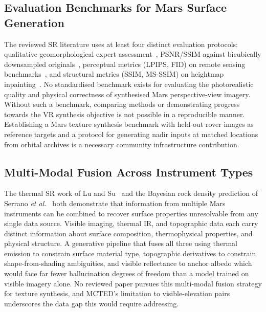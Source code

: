 \documentclass[10pt,journal]{IEEEtran}
\begin{document}
\subsection{Evaluation Benchmarks for Mars Surface Generation}
\label{subsec:eval}

The reviewed SR literature uses at least four distinct evaluation protocols:
qualitative geomorphological expert assessment~\cite{tao2021cassis}, PSNR/SSIM
against bicubically downsampled originals~\cite{wu2024rstsrn}, perceptual metrics
(LPIPS, FID) on remote sensing benchmarks~\cite{zhu2025taming, khanna2024diffusionsat},
and structural metrics (SSIM, MS-SSIM) on heightmap inpainting~\cite{catalano2025inpainting}.
No standardised benchmark exists for evaluating the photorealistic quality and
physical correctness of synthesised Mars perspective-view imagery. Without such
a benchmark, comparing methods or demonstrating progress towards the VR synthesis
objective is not possible in a reproducible manner. Establishing a Mars texture
synthesis benchmark with held-out rover images as reference targets and a
protocol for generating nadir inputs at matched locations from orbital
archives is a necessary community infrastructure contribution.

\subsection{Multi-Modal Fusion Across Instrument Types}
\label{subsec:multimodal}

The thermal SR work of Lu and Su~\cite{lu2025thermal} and the Bayesian rock
density prediction of Serrano \textit{et al.}~\cite{serrano2013hirise} both
demonstrate that information from multiple Mars instruments can be combined to
recover surface properties unresolvable from any single data source. Visible
imaging, thermal IR, and topographic data each carry distinct information
about surface composition, thermophysical properties, and physical structure. A
generative pipeline that fuses all three using thermal emission to constrain
surface material type, topographic derivatives to constrain shape-from-shading
ambiguities, and visible reflectance to anchor albedo which would face far fewer
hallucination degrees of freedom than a model trained on visible imagery alone.
No reviewed paper pursues this multi-modal fusion strategy for texture synthesis,
and MCTED's limitation to visible-elevation pairs underscores the data gap this
would require addressing.

\end{document}
